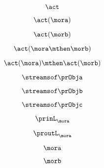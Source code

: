 \begin{forslides}
    \begin{equation}
        \label{eq:slides-processes-45}
        \act
    \end{equation}

    \begin{equation}
        \label{eq:slides-processes-46}
        \act(\mora)
    \end{equation}

    \begin{equation}
        \label{eq:slides-processes-47}
        \act(\morb)
    \end{equation}

    \begin{equation}
        \label{eq:slides-processes-48}
        \act(\mora \mthen \morb)
    \end{equation}

    \begin{equation}
        \label{eq:slides-processes-49}
        \act(\mora) \mthen \act(\morb)
    \end{equation}
    
    \begin{equation}
        \label{eq:slides-processes-50}
        \streamsof \prObja
    \end{equation}

    \begin{equation}
        \label{eq:slides-processes-51}
        \streamsof \prObjb
    \end{equation}

    \begin{equation}
        \label{eq:slides-processes-52}
        \streamsof \prObjc
    \end{equation}

    \begin{equation}
        \label{eq:slides-processes-53}
        \prinL_\mora
    \end{equation}

    \begin{equation}
        \label{eq:slides-processes-54}
        \proutL_\mora
    \end{equation}

    \begin{equation}
        \label{eq:slides-processes-55}
        \mora
    \end{equation}

    \begin{equation}
        \label{eq:slides-processes-56}
        \morb
    \end{equation}


\end{forslides}

